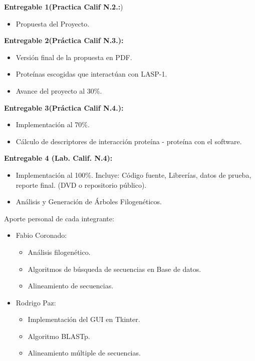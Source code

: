\documentclass[twocolumn,twoside,12pt]{article}
\begin{document}
\begin{itemize}
\textbf{Entregable 1(Practica Calif N.2.:})
\begin{itemize}
\item Propuesta del Proyecto.\\
\end{itemize}


\textbf{Entregable 2(Práctica Calif N.3.):}
\begin{itemize}
\item Versi\'on final de la propuesta en PDF.
\item Prote\'inas escogidas que interact\'uan con LASP-1.
\item Avance del proyecto al 30\%.\\
\end{itemize}

\textbf{Entregable 3(Práctica Calif N.4.):}
\begin{itemize}
\item Implementaci\'on al 70\%.
\item C\'alculo de descriptores de interacci\'on prote\'ina - prote\'ina con el software.\\

\end{itemize}

\textbf{Entregable 4 (Lab. Calif. N.4):}
\begin{itemize}
\item Implementaci\'on al 100\%. Incluye: C\'odigo fuente, Librer\'ias, datos de
prueba, reporte final. (DVD o repositorio p\'ublico).
\item An\'alisis y Generaci\'on de \'Arboles Filogen\'eticos.\\


\end{itemize}

Aporte personal de cada integrante:\\
\begin{itemize}
\item Fabio Coronado:
      \begin{itemize}
    
      \item An\'alisis filogen\'etico.
      \item Algoritmos de b\'usqueda de secuencias en Base de datos.
      \item Alineamiento de secuencias. 
      \end{itemize}
\item Rodrigo Paz:
      \begin{itemize}
      \item Implementaci\'on del GUI en Tkinter.
      \item Algoritmo BLASTp.
      \item Alineamiento m\'ultiple de secuencias.
      \end{itemize}


\end{itemize}
\end{itemize}
\end{document}
